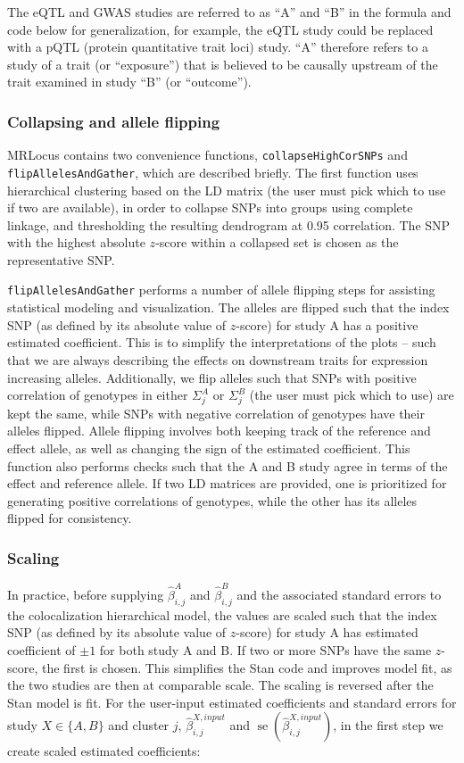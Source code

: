 \documentclass[11pt]{article}
\DeclareMathOperator{\se}{\textrm{se}}
\begin{document}
The eQTL and GWAS studies are referred to as ``A'' and ``B'' in the
formula and code below for generalization, for example, the eQTL study
could be replaced with a pQTL (protein quantitative trait loci)
study. ``A'' therefore refers to a study of a trait (or ``exposure'')
that is believed to be causally upstream of the trait examined in
study ``B'' (or ``outcome'').

\subsubsection{Collapsing and allele flipping}

MRLocus contains two convenience functions,
\texttt{collapseHighCorSNPs} and \texttt{flipAllelesAndGather}, which
are described briefly. The first function uses hierarchical clustering
based on the LD matrix (the user must pick which to use if two are
available), in order to collapse SNPs into groups using complete
linkage, and thresholding the resulting dendrogram at 0.95
correlation. The SNP with the highest absolute $z$-score within a
collapsed set is chosen as the representative SNP.

\texttt{flipAllelesAndGather} performs a number of allele flipping
steps for assisting statistical modeling and visualization. The
alleles are flipped such that the index SNP (as defined by its
absolute value of $z$-score) for study A has a positive estimated
coefficient. This is to simplify the interpretations of the plots --
such that we are always describing the effects on downstream traits
for expression increasing alleles. Additionally, we flip alleles such
that SNPs with positive correlation of genotypes in either
$\Sigma_j^A$ or $\Sigma_j^B$ (the user must pick which to use) are
kept the same, while SNPs with negative correlation of genotypes have
their alleles flipped. Allele flipping involves both keeping track of
the reference and effect allele, as well as changing the sign of the
estimated coefficient. This function also performs checks such that
the A and B study agree in terms of the effect and reference allele.
If two LD matrices are provided, one is prioritized for generating
positive correlations of genotypes, while the other has its alleles
flipped for consistency.

\subsubsection{Scaling}

In practice, before supplying
$\widehat{\beta}^A_{i,j}$ and $\widehat{\beta}^B_{i,j}$
and the associated standard errors to the colocalization hierarchical
model, the values are scaled such that the index SNP (as defined by
its absolute value of $z$-score) for study A has estimated coefficient
of $\pm 1$ for both study A and B. If two or more SNPs have the same
$z$-score, the first is chosen.  This simplifies the Stan code and
improves model fit, as the two studies are then at comparable
scale. The scaling is reversed after the Stan model is fit.  For the
user-input estimated coefficients and standard errors for
study $X \in \{A,B\}$ and cluster $j$,
$\widehat{\beta}^{X,input}_{i,j}$ and $\se(\widehat{\beta}^{X,input}_{i,j})$,
in the first step we create scaled estimated coefficients:
\end{document}
